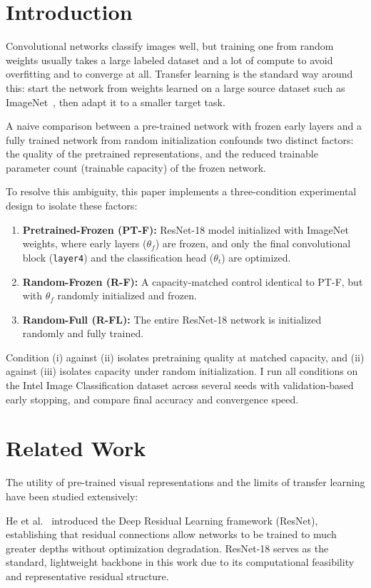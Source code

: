 \documentclass[conference]{IEEEtran}
\begin{document}
\section{Introduction}
Convolutional networks classify images well, but training one from random weights usually takes a large labeled dataset and a lot of compute to avoid overfitting and to converge at all. Transfer learning is the standard way around this: start the network from weights learned on a large source dataset such as ImageNet~\cite{deng2009imagenet}, then adapt it to a smaller target task.

A naive comparison between a pre-trained network with frozen early layers and a fully trained network from random initialization confounds two distinct factors: the quality of the pretrained representations, and the reduced trainable parameter count (trainable capacity) of the frozen network. 

To resolve this ambiguity, this paper implements a three-condition experimental design to isolate these factors:
\begin{enumerate}
    \item \textbf{Pretrained-Frozen (PT-F):} ResNet-18 model initialized with ImageNet weights, where early layers ($\theta_f$) are frozen, and only the final convolutional block (\texttt{layer4}) and the classification head ($\theta_t$) are optimized.
    \item \textbf{Random-Frozen (R-F):} A capacity-matched control identical to PT-F, but with $\theta_f$ randomly initialized and frozen.
    \item \textbf{Random-Full (R-FL):} The entire ResNet-18 network is initialized randomly and fully trained.
\end{enumerate}

Condition (i) against (ii) isolates pretraining quality at matched capacity, and (ii) against (iii) isolates capacity under random initialization. I run all conditions on the Intel Image Classification dataset across several seeds with validation-based early stopping, and compare final accuracy and convergence speed.

\section{Related Work}
The utility of pre-trained visual representations and the limits of transfer learning have been studied extensively:

He et al.~\cite{he2016deep} introduced the Deep Residual Learning framework (ResNet), establishing that residual connections allow networks to be trained to much greater depths without optimization degradation. ResNet-18 serves as the standard, lightweight backbone in this work due to its computational feasibility and representative residual structure.
\end{document}
